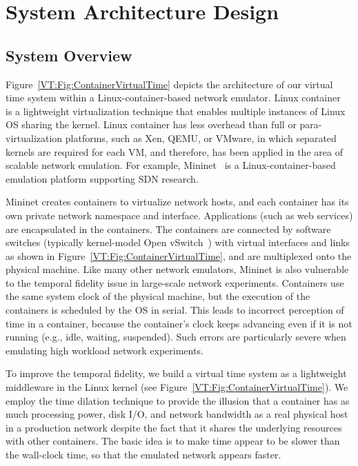 \section{System Architecture Design}
\label{VT:Sec:Architecture}

\subsection{System Overview}
Figure~\ref{VT:Fig:ContainerVirtualTime} depicts the architecture of our virtual time system within a Linux-container-based network emulator. 
Linux container~\cite{LXC} is a lightweight virtualization technique that enables multiple instances of Linux OS sharing the kernel. 
Linux container has less overhead than full or para-virtualization platforms, such as Xen, QEMU, or VMware,
in which separated kernels are required for each VM, and therefore,
has been applied in the area of scalable network emulation.
For example, Mininet~\cite{Mininet} is a Linux-container-based emulation platform supporting SDN research. 

Mininet creates containers to virtualize network hosts, and each container has its own private network namespace and interface. 
Applications (such as web services) are encapsulated in the containers. The containers are connected by software switches (typically kernel-model Open vSwitch~\cite{OpenvSwitch}) with virtual interfaces and links as shown in Figure~\ref{VT:Fig:ContainerVirtualTime}, and are multiplexed onto the physical machine. 
Like many other network emulators, Mininet is also vulnerable to the temporal fidelity issue in large-scale network experiments. 
Containers use the same system clock of the physical machine, but the execution of the containers is scheduled by the OS in serial. 
This leads to incorrect perception of time in a container, because the container's clock keeps advancing even if it is not running (e.g., idle, waiting, suspended). 
Such errors are particularly severe when emulating high workload network experiments.

To improve the temporal fidelity, we build a virtual time system as a lightweight middleware in the Linux kernel (see Figure~\ref{VT:Fig:ContainerVirtualTime}). 
We employ the time dilation technique to provide the illusion that a container has as much processing power,
disk I/O, and network bandwidth as a real physical host in a production network despite the fact that it shares the underlying resources with other containers. 
The basic idea is to make time appear to be slower than the wall-clock time, so that the emulated network appears faster.

